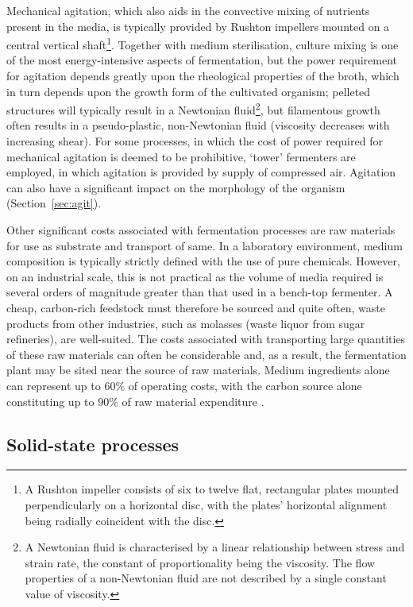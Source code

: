 Mechanical agitation, which also aids in the convective mixing of nutrients present in the media, is typically provided by Rushton impellers mounted on a central vertical shaft\footnote{A Rushton impeller consists of six to twelve flat, rectangular plates mounted perpendicularly on a horizontal disc, with the plates' horizontal alignment being radially coincident with the disc.}. Together with medium sterilisation, culture mixing is one of the most energy-intensive aspects of fermentation, but the power requirement for agitation depends greatly upon the rheological properties of the broth, which in turn depends upon the growth form of the cultivated organism; pelleted structures will typically result in a Newtonian fluid\footnote{A Newtonian fluid is characterised by a linear relationship between stress and strain rate, the constant of proportionality being the viscosity. The flow properties of a non-Newtonian fluid are not described by a single constant value of viscosity.}, but filamentous growth often results in a pseudo-plastic, non-Newtonian fluid (viscosity decreases with increasing shear). For some processes, in which the cost of power required for mechanical agitation is deemed to be prohibitive, \lq tower' fermenters are employed, in which agitation is provided by supply of compressed air. Agitation can also have a significant impact on the morphology of the organism (Section~\ref{sec:agit}).

Other significant costs associated with fermentation processes are raw materials for use as substrate and transport of same. In a laboratory environment, medium composition is typically strictly defined with the use of pure chemicals. However, on an industrial scale, this is not practical as the volume of media required is several orders of magnitude greater than that used in a bench-top fermenter. A cheap, carbon-rich feedstock must therefore be sourced and quite often, waste products from other industries, such as molasses (waste liquor from sugar refineries), are well-suited. The costs associated with transporting large quantities of these raw materials can often be considerable and, as a result, the fermentation plant may be sited near the source of raw materials. Medium ingredients alone can represent up to 60\% of operating costs, with the carbon source alone constituting up to 90\% of raw material expenditure \cite{kristiansen2001}.

\subsection{Solid-state processes}


